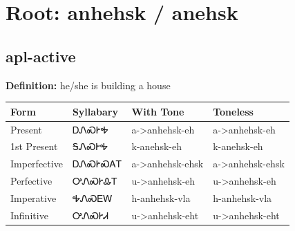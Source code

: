 \documentclass{article}%
\begin{document}
%
\normalsize%
\section*{Root: anhehsk / anehsk}%
\subsection*{apl-active}%
\textbf{Definition: }%
he/she is building a house%
\\[0.5em]%
\begin{tabular}{|l|l|l|l|}%
\hline%
\textbf{Form}&\textbf{Syllabary}&\textbf{With Tone}&\textbf{Toneless}\\%
\hline%
Present&ᎠᏁᏍᎨᎭ&a{-}>anhehsk{-}eh&a{-}>anhehsk{-}eh\\%
1st Present&ᎦᏁᏍᎨᎭ&k{-}anehsk{-}eh&k{-}anehsk{-}eh\\%
Imperfective&ᎠᏁᏍᎨᏍᎪᎢ&a{-}>anhehsk{-}ehsk&a{-}>anhehsk{-}ehsk\\%
Perfective&ᎤᏁᏍᎨᎲᎢ&u{-}>anhehsk{-}eh&u{-}>anhehsk{-}eh\\%
Imperative&ᎭᏁᏍᎬᎳ&h{-}anhehsk{-}vla&h{-}anhehsk{-}vla\\%
Infinitive&ᎤᏁᏍᎨᏗ&u{-}>anhehsk{-}eht&u{-}>anhehsk{-}eht\\%
\hline%
\end{tabular}%
\\[1em]%
\end{document}
